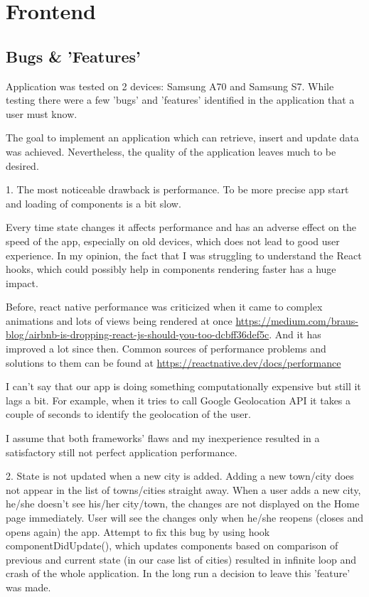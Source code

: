 

\section{Frontend}
\subsection{Bugs \& 'Features'}
Application was tested on 2 devices: Samsung A70 and Samsung S7. While testing there were a few 'bugs' and 'features' identified in the application that a user must know.

The goal to implement an application which can retrieve, insert and update data was achieved.
Nevertheless, the quality of the application leaves much to be desired.

1. The most noticeable drawback is performance. To be more precise app start and loading of components is a bit slow.

Every time state changes it affects performance and has an adverse effect on the speed of the app, especially on old devices, which does not lead to good user experience. 
In my opinion, the fact that I was struggling to understand the React hooks, which could possibly help in components rendering faster has a huge impact.

Before, react native performance was criticized when it came to complex animations and lots of views being rendered at once 
\url{https://medium.com/braus-blog/airbnb-is-dropping-react-js-should-you-too-dcbff36def5c}. And it has improved a lot since then.
Common sources of performance problems and solutions to them can be found at \url{https://reactnative.dev/docs/performance}

I can't say that our app is doing something computationally expensive but still it lags a bit. For example, when it tries to call Google Geolocation API it takes a couple of seconds to identify the geolocation of the user. 

I assume that both frameworks' flaws and my inexperience resulted in a satisfactory still not perfect application performance. 

2. State is not updated when a new city is added.
Adding a new town/city does not appear in the list of towns/cities straight away.
When a user adds a new city, he/she doesn't see his/her city/town, the changes are not displayed on the Home page immediately. User will see the changes only when he/she reopens (closes and opens again) the app.
Attempt to fix this bug by using hook componentDidUpdate(), which updates components based on comparison of previous and current state (in our case list of cities) resulted in infinite loop and crash of the whole application. In the long run a decision to leave this 'feature' was made.

